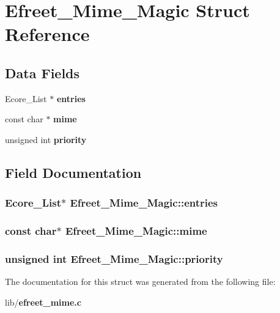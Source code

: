 \section{Efreet\_\-Mime\_\-Magic Struct Reference}
\label{structEfreet__Mime__Magic}
\subsection*{Data Fields}
\begin{CompactItemize}
\item 
Ecore\_\-List $\ast$ {\bf entries}
\item 
const char $\ast$ {\bf mime}
\item 
unsigned int {\bf priority}
\end{CompactItemize}


\subsection{Field Documentation}
\subsubsection{\setlength{\rightskip}{0pt plus 5cm}Ecore\_\-List$\ast$ {\bf Efreet\_\-Mime\_\-Magic::entries}}\label{structEfreet__Mime__Magic_2c7c0956c1cba9e61497825bc186cd99}


\subsubsection{\setlength{\rightskip}{0pt plus 5cm}const char$\ast$ {\bf Efreet\_\-Mime\_\-Magic::mime}}\label{structEfreet__Mime__Magic_33981d2c0c90ac176cbf6521f015a7cd}


\subsubsection{\setlength{\rightskip}{0pt plus 5cm}unsigned int {\bf Efreet\_\-Mime\_\-Magic::priority}}\label{structEfreet__Mime__Magic_518e48b9f4b1761609a3fa8bc0b5b43e}




The documentation for this struct was generated from the following file:\begin{CompactItemize}
\item 
lib/{\bf efreet\_\-mime.c}\end{CompactItemize}
